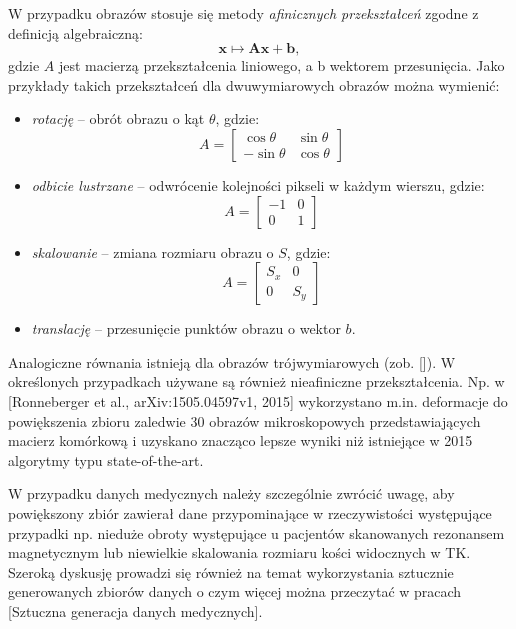 W przypadku obrazów stosuje się metody \textit{afinicznych przekształceń} zgodne z definicją algebraiczną:
\begin{equation}
	\mathbf x \mapsto \mathbf{Ax} + \mathbf b,
\end{equation}
gdzie $A$ jest macierzą przekształcenia liniowego, a b wektorem przesunięcia. Jako przykłady takich przekształceń dla dwuwymiarowych obrazów można wymienić:
\begin{itemize}
	\item \textit{rotację} -- obrót obrazu o kąt $\theta$, gdzie:
	\begin{equation}
	A = \begin{bmatrix} 
	\cos \theta & \sin \theta\\
	-\sin \theta & \cos \theta
	\end{bmatrix}
	\end{equation}	
	\item \textit{odbicie lustrzane} -- odwrócenie kolejności pikseli w każdym wierszu, gdzie:
	\begin{equation}
		A = \begin{bmatrix} 
		-1 & 0\\
		0 & 1
	\end{bmatrix}
	\end{equation}
	\item \textit{skalowanie} -- zmiana rozmiaru obrazu o $S$, gdzie:
	\begin{equation}
			A = \begin{bmatrix} 
		S_x & 0\\
		0 & S_y
	\end{bmatrix}
	\end{equation}
	\item \textit{translację} -- przesunięcie punktów obrazu o wektor $b$.
\end{itemize}

Analogiczne równania istnieją dla obrazów trójwymiarowych (zob. []). W określonych przypadkach używane są również nieafiniczne przekształcenia. Np. w [Ronneberger et al., arXiv:1505.04597v1, 2015] wykorzystano m.in. deformacje do powiększenia zbioru zaledwie 30 obrazów mikroskopowych przedstawiających macierz komórkową i uzyskano znacząco lepsze wyniki niż istniejące w 2015 algorytmy typu state-of-the-art.

W przypadku danych medycznych należy szczególnie zwrócić uwagę, aby powiększony zbiór zawierał dane przypominające w rzeczywistości występujące przypadki np. nieduże obroty występujące u pacjentów skanowanych rezonansem magnetycznym lub niewielkie skalowania rozmiaru kości widocznych w TK. Szeroką dyskusję prowadzi się również na temat wykorzystania sztucznie generowanych zbiorów danych o czym więcej można przeczytać w pracach [Sztuczna generacja danych medycznych]. 

